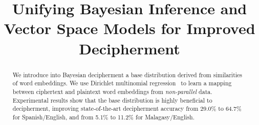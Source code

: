 \documentclass[11pt]{article}
\title{Unifying Bayesian Inference and Vector Space Models for Improved Decipherment}
\date{}
\begin{document}
\maketitle
\begin{abstract}
We introduce into Bayesian decipherment a base distribution derived from similarities of word embeddings. We use Dirichlet multinomial regression~\cite{mimno2012topic} to learn a mapping between ciphertext and plaintext word embeddings from \emph{non-parallel} data. Experimental results show that the base distribution is highly beneficial to decipherment, improving state-of-the-art decipherment accuracy from 29.0\% to 64.7\% for Spanish/English, and from 5.1\% to 11.2\% for Malagasy/English. %

 
\end{abstract}




%
%








\end{document}
